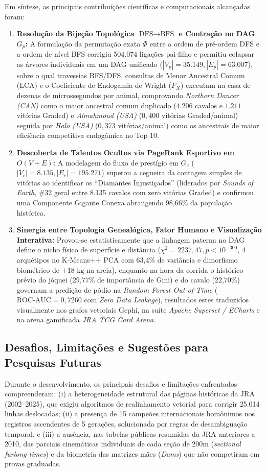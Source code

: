 \documentclass[conference]{IEEEtran}
\begin{document}
Em síntese, as principais contribuições científicas e computacionais alcançadas foram:
\begin{enumerate}
    \item \textbf{Resolução da Bijeção Topológica $\text{DFS}\to\text{BFS}$ e Contração no DAG $G_p$:} A formulação da permutação exata $\Phi$ entre a ordem de pré-ordem DFS e a ordem de nível BFS corrigiu 504.074 ligações pai-filho e permitiu colapsar as árvores individuais em um DAG unificado ($|V_p| = 35.149, |E_p| = 63.007$), sobre o qual travessias BFS/DFS, consultas de Menor Ancestral Comum (LCA) e o Coeficiente de Endogamia de Wright ($F_X$) executam na casa de dezenas de microssegundos por animal, comprovando \textit{Northern Dancer (CAN)} como o maior ancestral comum duplicado ($4.206$ cavalos e $1.211$ vitórias Graded) e \textit{Almahmoud (USA)} ($0,400$ vitórias Graded/animal) seguida por \textit{Halo (USA)} ($0,373$ vitórias/animal) como os ancestrais de maior eficiência competitiva endogâmica no Top 10.
    \item \textbf{Descoberta de Talentos Ocultos via PageRank Esportivo em $O(V + E)$:} A modelagem do fluxo de prestígio em $G_c$ ($|V_c| = 8.135, |E_c| = 195.271$) superou a cegueira da contagem simples de vitórias ao identificar os ``Diamantes Injustiçados'' (liderados por \textit{Sounds of Earth}, \#32 geral entre 8.135 cavalos com zero vitórias Graded) e confirmou uma Componente Gigante Conexa abrangendo 98,66\%
da população histórica.
    \item \textbf{Sinergia entre Topologia Genealógica, Fator Humano e Visualização Interativa:} Provou-se estatisticamente que a linhagem paterna no DAG define o nicho físico de superfície e distância ($\chi^2 = 2237,47, p < 10^{-300}$, 4 arquétipos no K-Means++ PCA com 63,4\%
de variância e dimorfismo biométrico de $+18\text{ kg}$ na areia), enquanto na hora da corrida o histórico prévio do jóquei (29,77\%
de importância de Gini) e do cavalo (22,70\%)
governam a predição de pódio na \textit{Random Forest Out-of-Time} ($\text{ROC-AUC} = 0,7260$ com \textit{Zero Data Leakage}), resultados estes traduzidos visualmente nos grafos vetoriais Gephi, na suíte \textit{Apache Superset / ECharts} e na arena gamificada \textit{JRA TCG Card Arena}.
\end{enumerate}

\subsection{Desafios, Limitações e Sugestões para Pesquisas Futuras}
Durante o desenvolvimento, os principais desafios e limitações enfrentados compreenderam: (i) a heterogeneidade estrutural das páginas históricas da JRA (2002--2025), que exigiu algoritmos de realinhamento vetorial para corrigir 25.014 linhas deslocadas; (ii) a presença de 15 campeões internacionais homônimos nos registros ascendentes de 5 gerações, solucionada por regras de desambiguação temporal; e (iii) a ausência, nas tabelas públicas resumidas da JRA anteriores a 2010, das parciais cinemáticas individuais de cada seção de $200\text{m}$ (\textit{sectional furlong times}) e da biometria das matrizes mães (\textit{Dams}) que não competiram em provas graduadas.
\end{document}

